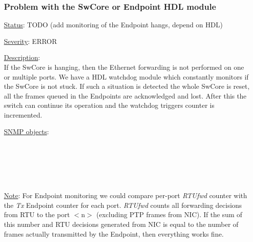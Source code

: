 \subsubsection{\bf Problem with the SwCore or Endpoint HDL module}
		\label{fail:data:swcore_hang}
		\begin{pck_descr}
    \item [] \underline{Status}: TODO (add monitoring of the Endpoint hangs, depend on
      HDL)
			\item [] \underline{Severity}: ERROR
			\item [] \underline{Description}:\\
				If the SwCore is hanging, then the Ethernet forwarding is not
				performed on one or multiple ports. We have a HDL watchdog module which
				constantly monitors if the SwCore is not stuck. If such a situation is
				detected the whole SwCore is reset, all the frames queued in the
        Endpoints are acknowledged and lost. After this the switch can continue
				its operation and the watchdog triggers counter is incremented.
			\item [] \underline{SNMP objects}:\\
        {\footnotesize
				\\
				\\
				\\
				\\
				\\
         }
			\item [] \underline{Note}: For Endpoint monitoring we could compare
				per-port \emph{RTUfwd} counter with the \emph{Tx} Endpoint counter for
				each port. \emph{RTUfwd} counts all forwarding decisions from RTU to the
				port $<$n$>$ (excluding PTP frames from NIC). If the sum of this number
				and RTU decisions generated from NIC is equal to the number of frames
				actually transmitted by the Endpoint, then everything works fine.
		\end{pck_descr}

